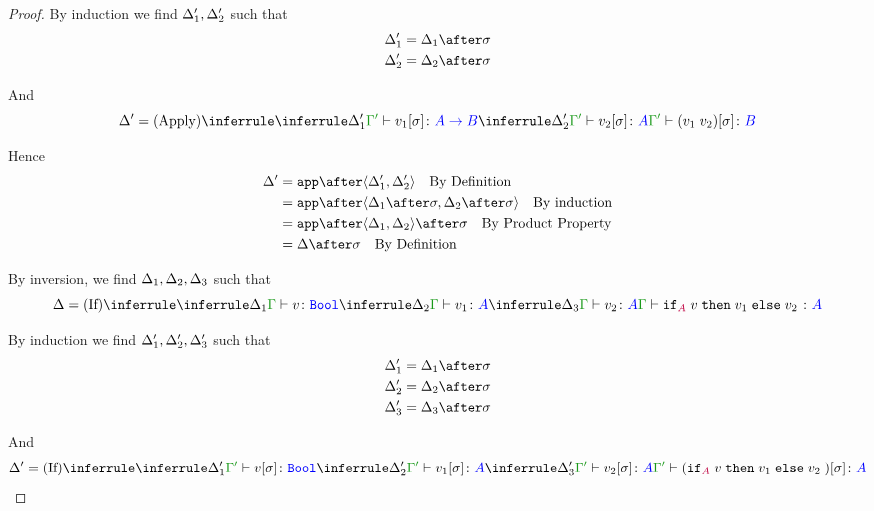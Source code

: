 \documentclass{report}
\begin{document}
\begin{framed}
\begin{proof}
        By induction we find $\Delta_1', \Delta_2'$ such that 
        \begin{align*}
            \D_1' &= \D_1\after\si\\
            \D_2' &= \D_2\after\si\\
        \end{align*}
        
        And
        \begin{equation}
            \D' = \ntreeruleII{\vapply}{\treeruleI{\D_1'}{\typerelation{\G'}{v_1\ssi}{\ab}}}{\treeruleI{\D_2'}{\typerelation{\G'}{v_2\ssi}{A}}}{\typerelation{\G'}{(\apply{v_1}{v_2})\ssi}{B}}
        \end{equation}
        
        Hence
        \begin{align*}
            \D' &= \app\after\pr{\D_1'}{\D_2'}\qt{By Definition}\\
                &= \app\after\pr{\D_1\after\si}{\D_2\after\si}\qt{By induction}\\
                &= \app\after\pr{\D_1}{\D_2}\after\si\qt{By Product Property}\\
                & = \D\after\si\qt{By Definition}\\
        \end{align*}
        
        \case{\vif}
        
        
        By inversion, we find $\Delta_1, \Delta_2, \Delta_3$ such that
        \begin{equation}
            \D = \ntreeruleIII{\vif}{\treeruleI{\D_1}{\typerelation{\G}{v}{\B}}}{\treeruleI{\D_2}{\typerelation{\G}{v_1}{ A}}}{\treeruleI{\D_3}{\typerelation{\G}{v_2}{ A}}}{\typerelation{\G}{\pifthenelse{A}{v}{v_1}{v_2}}{ A}}
        \end{equation}
        
        By induction we find $\Delta_1', \Delta_2', \Delta_3'$ such that 
        \begin{align*}
            \D_1' &= \D_1\after\si\\
            \D_2' &= \D_2\after\si\\
            \D_3' &= \D_3\after\si\\
        \end{align*}
        
        And
        \begin{equation}
            \D' = \ntreeruleIII{\vif}{\treeruleI{\D_1'}{\typerelation{\G'}{v\ssi}{\B}}}{\treeruleI{\D_2'}{\typerelation{\G'}{v_1\ssi}{ A}}}{\treeruleI{\D_3'}{\typerelation{\G'}{v_2\ssi}{ A}}}{\typerelation{\G'}{(\pifthenelse{A}{v}{v_1}{v_2})\ssi}{ A}}
        \end{equation}
        

\end{proof}
\end{framed}
\end{document}
